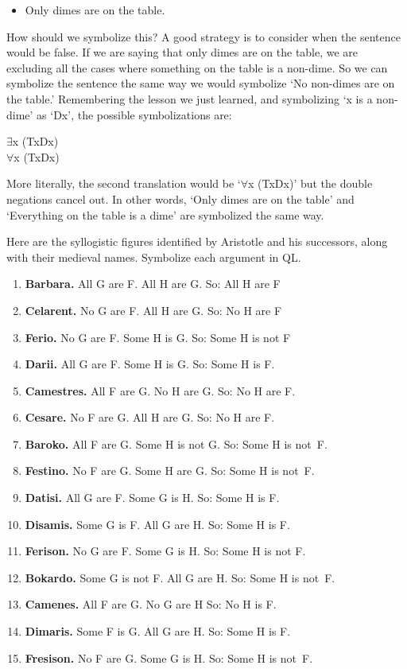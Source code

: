 \begin{itemize}
\item[\ex{coin5}]Only dimes are on the table.
\end{itemize}

How should we symbolize this? A good strategy is to consider when the sentence would be false. If we are saying that only dimes are on the table, we are excluding all the cases where something on the table is a non-dime. So we can symbolize the sentence the same way we would symbolize ‘No non-dimes are on the table.’ Remembering the lesson we just learned, and symbolizing ‘x is a non-dime’ as ‘\enot Dx’, the possible symbolizations are: 
\begin{center}
\enot $\exists$x (Tx\eand  \enot Dx)\\
$\forall$x (Tx\eif Dx)
\end{center}
More literally, the second translation would be ‘$\forall$x (Tx\eif \enot \enot Dx)' but the double negations cancel out. In other words, ‘Only dimes are on the table’ and ‘Everything on the table is a dime’ are symbolized the same way.

\ghazali

\practiceproblems
\problempart
\label{pr.BarbaraEtc}
Here are the syllogistic figures identified by Aristotle and his successors, along with their medieval names. Symbolize each argument in QL.
\begin{enumerate}
	\item \textbf{Barbara.} All G are F. All H are G. So:  All H are F
	\item \textbf{Celarent.} No G are F. All H are G. So: No H are F
	\item \textbf{Ferio.} No G are F. Some H is G. So: Some H is not F
	\item \textbf{Darii.} All G are F. Some H is G. So: Some H is F.
	\item \textbf{Camestres.} All F are G. No H are G. So: No H are F.
	\item \textbf{Cesare.} No F are G. All H are G. So: No H are F.
	\item \textbf{Baroko.} All F are G. Some H is not G. So: Some H is not~F.
	\item \textbf{Festino.} No F are G. Some H are G. So: Some H is not~F.
	\item \textbf{Datisi.} All G are F. Some G is H. So: Some H is F.
	\item \textbf{Disamis.} Some G is F. All G are H. So: Some H is F.
	\item \textbf{Ferison.} No G are F. Some G is H. So: Some H is not F.
	\item \textbf{Bokardo.} Some G is not F. All G are H. So:  Some H is not~F.
	\item \textbf{Camenes.} All F are G. No G are H So: No H is F.
	\item \textbf{Dimaris.} Some F is G. All G are H. So: Some H is F.
	\item \textbf{Fresison.} No F are G. Some G is H. So: Some H is not~F.
\end{enumerate}

